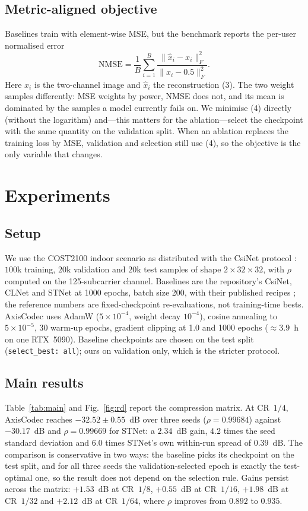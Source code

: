 \documentclass[journal]{IEEEtran}
\begin{document}
\subsection{Metric-aligned objective}
Baselines train with element-wise MSE, but the benchmark reports the per-user
normalised error
\begin{equation}
\mathrm{NMSE}=\frac{1}{B}\sum_{i=1}^{B}
\frac{\lVert\hat x_i-x_i\rVert_F^2}{\lVert x_i-0.5\rVert_F^2}.
\end{equation}
Here $x_i$ is the two-channel image and $\hat x_i$ the reconstruction (3).
The two weight samples differently: MSE weights by power, NMSE does not, and its
mean is dominated by the samples a model currently fails on. We minimise (4)
directly (without the logarithm) and---this matters for the ablation---select the
checkpoint with the same quantity on the validation split. When an ablation
replaces the training loss by MSE, validation and selection still use (4), so the
objective is the only variable that changes.

\section{Experiments}\label{sec:exp}
\subsection{Setup}
We use the COST2100 indoor scenario as distributed with the CsiNet protocol
\cite{wen2018,liu2012cost}: $100$k training, $20$k validation and $20$k test
samples of shape $2\times32\times32$, with $\rho$ computed on the 125-subcarrier
channel. Baselines
are the repository's CsiNet, CLNet and STNet at 1000 epochs, batch size 200, with
their published recipes \cite{wen2018,ji2021,mourya2023}; the reference numbers are
fixed-checkpoint re-evaluations, not training-time bests. AxisCodec uses AdamW
($5\times10^{-4}$, weight decay $10^{-4}$), cosine annealing to $5\times10^{-5}$,
30 warm-up epochs, gradient clipping at 1.0 and 1000 epochs ($\approx3.9$~h on one
RTX~5090). Baseline checkpoints are chosen on the test split
(\texttt{select\_best: all}); ours on validation only, which is the stricter
protocol.

\subsection{Main results}
Table~\ref{tab:main} and Fig.~\ref{fig:rd} report the compression matrix.
At CR~$1/4$, AxisCodec reaches $-32.52\pm0.55$~dB over three seeds
($\rho=0.99684$) against $-30.17$~dB and $\rho=0.99669$ for STNet: a $2.34$~dB
gain, $4.2$ times the seed standard deviation and $6.0$ times STNet's own
within-run spread of $0.39$~dB. The comparison is conservative in two ways: the
baseline picks its checkpoint on the test split, and for all three seeds the
validation-selected epoch is exactly the test-optimal one, so the result does not
depend on the selection rule.
Gains persist across the matrix: $+1.53$~dB at CR~$1/8$, $+0.55$~dB at CR~$1/16$,
$+1.98$~dB at CR~$1/32$ and $+2.12$~dB at CR~$1/64$, where $\rho$ improves from
$0.892$ to $0.935$.
\end{document}
